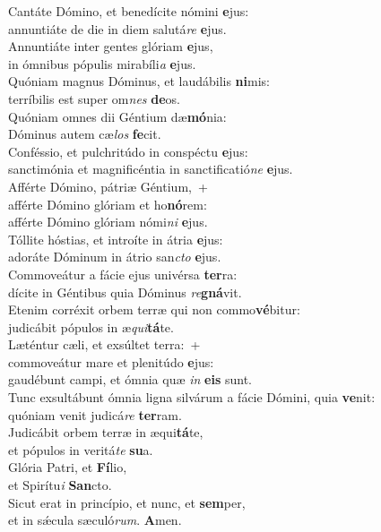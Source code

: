 \evenverse Cantáte Dómino, et benedícite nómini \textbf{e}jus:~\*\\
\evenverse annuntiáte de die in diem salutá\textit{re} \textbf{e}jus.\\
\oddverse Annuntiáte inter gentes glóriam \textbf{e}jus,~\*\\
\oddverse in ómnibus pópulis mirabíli\textit{a} \textbf{e}jus.\\
\evenverse Quóniam magnus Dóminus, et laudábilis \textbf{ni}mis:~\*\\
\evenverse terríbilis est super om\textit{nes} \textbf{de}os.\\
\oddverse Quóniam omnes dii Géntium dæ\textbf{mó}nia:~\*\\
\oddverse Dóminus autem cæ\textit{los} \textbf{fe}cit.\\
\evenverse Conféssio, et pulchritúdo in conspéctu \textbf{e}jus:~\*\\
\evenverse sanctimónia et magnificéntia in sanctificatió\textit{ne} \textbf{e}jus.\\
\oddverse Afférte Dómino, pátriæ Géntium,~+\\
\oddverse  afférte Dómino glóriam et ho\textbf{nó}rem:~\*\\
\oddverse afférte Dómino glóriam nómi\textit{ni} \textbf{e}jus.\\
\evenverse Tóllite hóstias, et introíte in átria \textbf{e}jus:~\*\\
\evenverse adoráte Dóminum in átrio san\textit{cto} \textbf{e}jus.\\
\oddverse Commoveátur a fácie ejus univérsa \textbf{ter}ra:~\*\\
\oddverse dícite in Géntibus quia Dóminus \textit{re}\textbf{gná}vit.\\
\evenverse Etenim corréxit orbem terræ qui non commo\textbf{vé}bitur:~\*\\
\evenverse judicábit pópulos in æ\textit{qui}\textbf{tá}te.\\
\oddverse Læténtur cæli, et exsúltet terra:~+\\
\oddverse  commoveátur mare et plenitúdo \textbf{e}jus:~\*\\
\oddverse gaudébunt campi, et ómnia quæ \textit{in} \textbf{e}\textbf{is} sunt.\\
\evenverse Tunc exsultábunt ómnia ligna silvárum a fácie Dómini, quia \textbf{ve}nit:~\*\\
\evenverse quóniam venit judicá\textit{re} \textbf{ter}ram.\\
\oddverse Judicábit orbem terræ in æqui\textbf{tá}te,~\*\\
\oddverse et pópulos in veritá\textit{te} \textbf{su}a.\\
\evenverse Glória Patri, et \textbf{Fí}lio,~\*\\
\evenverse et Spirítu\textit{i} \textbf{San}cto.\\
\oddverse Sicut erat in princípio, et nunc, et \textbf{sem}per,~\*\\
\oddverse et in sǽcula sæculó\textit{rum}. \textbf{A}men.\\
